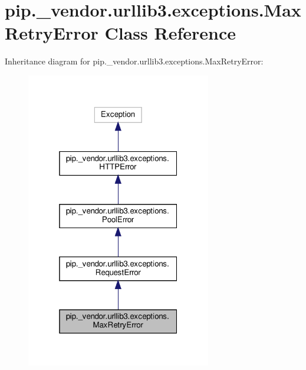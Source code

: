 \hypertarget{classpip_1_1__vendor_1_1urllib3_1_1exceptions_1_1MaxRetryError}{}\section{pip.\+\_\+vendor.\+urllib3.\+exceptions.\+Max\+Retry\+Error Class Reference}
\label{classpip_1_1__vendor_1_1urllib3_1_1exceptions_1_1MaxRetryError}


Inheritance diagram for pip.\+\_\+vendor.\+urllib3.\+exceptions.\+Max\+Retry\+Error\+:
\nopagebreak
\begin{figure}[H]
\begin{center}
\leavevmode
\includegraphics[width=229pt]{classpip_1_1__vendor_1_1urllib3_1_1exceptions_1_1MaxRetryError__inherit__graph}
\end{center}
\end{figure}


